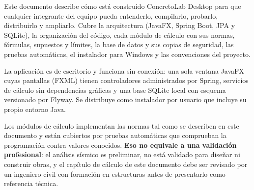 Este documento describe cómo está construido ConcretoLab Desktop \versionapp{} para que cualquier integrante del equipo
pueda entenderlo, compilarlo, probarlo, distribuirlo y ampliarlo. Cubre la arquitectura (JavaFX, Spring Boot, JPA y
SQLite), la organización del código, cada módulo de cálculo con sus normas, fórmulas, supuestos y límites, la base de
datos y sus copias de seguridad, las pruebas automáticas, el instalador para Windows y las convenciones del proyecto.

La aplicación es de escritorio y funciona sin conexión: una sola ventana JavaFX cuyas pantallas (FXML) tienen
controladores administrados por Spring, servicios de cálculo sin dependencias gráficas y una base SQLite local con
esquema versionado por Flyway. Se distribuye como instalador  por usuario que incluye su propio entorno Java.

\begin{importante}
Los módulos de cálculo implementan las normas tal como se describen en este documento y están cubiertos por pruebas
automáticas que comprueban la programación contra valores conocidos. \textbf{Eso no equivale a una validación
profesional}: el análisis sísmico es preliminar, no está validado para diseñar ni construir obras, y el capítulo de
cálculo de este documento debe ser revisado por un ingeniero civil con formación en estructuras antes de presentarlo
como referencia técnica.
\end{importante}
